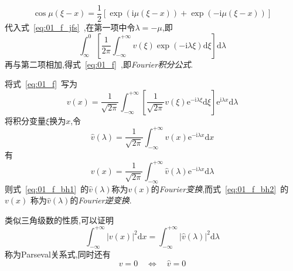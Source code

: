 \documentclass[a4paper,cs4size,adobefonts,fancyhdr]{ctexart}[2005/11/25]
\newcommand{\dif}{\mathrm{d}}
\newcommand*{\me}{\ensuremath{\mathrm{e}}}    %
\newcommand*{\mi}{\ensuremath{\mathrm{i}}}        %
\begin{document}
\begin{equation*}
 \cos\mu(\xi-x)=\dfrac{1}{2}\left[\exp(\mi\mu(\xi-x))+\exp(-\mi\mu(\xi-x))\right]
\end{equation*}
代入式~\eqref{eq:01_f_jfs}~,在第一项中令$\lambda=-\mu$,即
\begin{equation*}
 \int_{\infty}^{0}\left[\dfrac{1}{2\pi}\int_{-\infty}^{+\infty} v(\xi)\exp(-\mi\lambda\xi)\dif\xi\right]\dif\lambda
\end{equation*}
再与第二项相加,得式~\eqref{eq:01_f}~,即\emph{Fourier积分公式}.\par
将式~\eqref{eq:01_f}~写为
\begin{equation*}
 v(x)=\dfrac{1}{\sqrt{2\pi}}\int_{-\infty}^{+\infty}\left[\dfrac{1}{\sqrt{2\pi}}
 v(\xi)\me^{-\mi\lambda\xi}\dif\xi\right]\me^{\mi\lambda x}\dif\lambda
\end{equation*}
将积分变量$\xi$换为$x$,令
\begin{equation}\label{eq:01_f_bh1}
 \hat{v}(\lambda)=\dfrac{1}{\sqrt{2\pi}}\int_{-\infty}^{+\infty}v(x)\me^{-\mi\lambda x}\dif x
\end{equation}
有
\begin{equation}\label{eq:01_f_bh2}
 v(x)=\dfrac{1}{\sqrt{2\pi}}\int_{-\infty}^{+\infty}\hat{v}(\lambda)\me^{-\mi\lambda x}\dif\lambda
\end{equation}
则式~\eqref{eq:01_f_bh1}~的$\hat{v}(\lambda)$称为$v(x)$的\emph{Fourier变换},而式~\eqref{eq:01_f_bh2}~的$v(x)$
称为$\hat{v}(\lambda)$的\emph{Fourier逆变换}.\par
类似三角级数的性质,可以证明
\begin{equation}
 \int_{-\infty}^{+\infty}|v(x)|^2\dif x=\int_{-\infty}^{+\infty}|\hat{v}(\lambda)|^2\dif\lambda
\end{equation}
称为Parseval关系式,同时还有
\begin{equation}
 v=0\quad\Leftrightarrow\quad \hat{v}=0
\end{equation}
\end{document}
